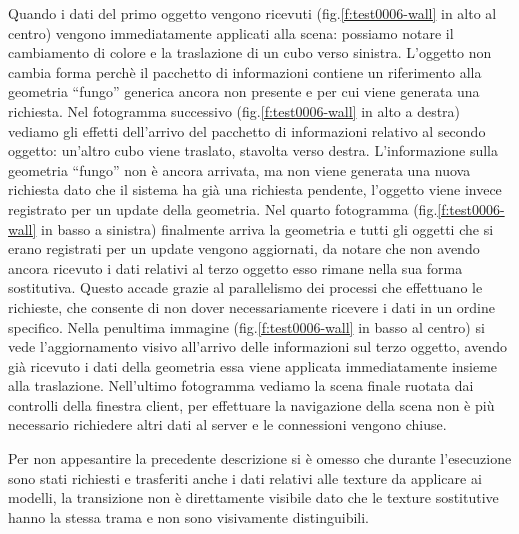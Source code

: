 Quando i dati del primo oggetto vengono ricevuti (fig.\ref{f:test0006-wall} in alto al centro) vengono immediatamente applicati alla scena: possiamo notare il cambiamento di colore e la traslazione di un cubo verso sinistra. 
L'oggetto non cambia forma perch\`e il pacchetto di informazioni contiene un riferimento alla geometria ``fungo'' generica ancora non presente e per cui viene generata una richiesta. 
Nel fotogramma successivo (fig.\ref{f:test0006-wall} in alto a destra) vediamo gli effetti dell'arrivo del pacchetto di informazioni relativo al secondo oggetto: un'altro cubo viene traslato, stavolta verso destra. 
L'informazione sulla geometria ``fungo'' non \`e ancora arrivata, ma non viene generata una nuova richiesta dato che il sistema ha gi\`a una richiesta pendente, l'oggetto viene invece registrato per un update della geometria.
Nel quarto fotogramma (fig.\ref{f:test0006-wall} in basso a sinistra) finalmente arriva la geometria e tutti gli oggetti che si erano registrati per un update vengono aggiornati, da notare che non avendo ancora ricevuto i dati relativi al terzo oggetto esso rimane nella sua forma sostitutiva. Questo accade grazie al parallelismo dei processi che effettuano le richieste, che consente di non dover necessariamente ricevere i dati in un ordine specifico.
Nella penultima immagine (fig.\ref{f:test0006-wall} in basso al centro) si vede l'aggiornamento visivo all'arrivo delle informazioni sul terzo oggetto, avendo gi\`a ricevuto i dati della geometria essa viene applicata immediatamente insieme alla traslazione. Nell'ultimo fotogramma vediamo la scena finale ruotata dai controlli della finestra client, per effettuare la navigazione della scena non \`e pi\`u necessario richiedere altri dati al server e le connessioni vengono chiuse.

Per non appesantire la precedente descrizione si \`e omesso che durante l'esecuzione sono stati richiesti e trasferiti anche i dati relativi alle texture da applicare ai modelli, la transizione non \`e direttamente visibile dato che le texture sostitutive hanno la stessa trama e non sono visivamente distinguibili.

